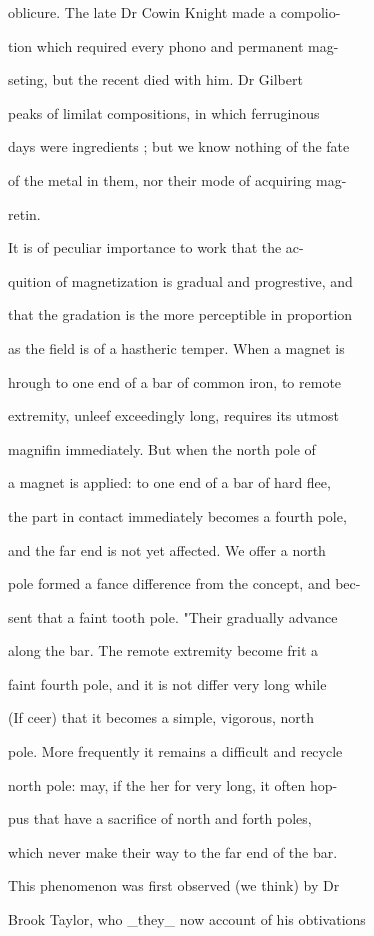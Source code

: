 \documentclass{article}
\begin{document}
oblicure. The late Dr Cowin Knight made a compolio-

tion which required every phono and permanent mag-

seting, but the recent died with him. Dr Gilbert

peaks of limilat compositions, in which ferruginous

days were ingredients ; but we know nothing of the fate

of the metal in them, nor their mode of acquiring mag-

retin.

It is of peculiar importance to work that the ac-

quition of magnetization is gradual and progrestive, and

that the gradation is the more perceptible in proportion

as the field is of a hastheric temper. When a magnet is

hrough to one end of a bar of common iron, to remote

extremity, unleef exceedingly long, requires its utmost

magnifin immediately. But when the north pole of

a magnet is applied: to one end of a bar of hard flee,

the part in contact immediately becomes a fourth pole,

and the far end is not yet affected. We offer a north

pole formed a fance difference from the concept, and bec-

sent that a faint tooth pole. "Their gradually advance

along the bar. The remote extremity become frit a

faint fourth pole, and it is not differ very long while

(If ceer) that it becomes a simple, vigorous, north

pole. More frequently it remains a difficult and recycle

north pole: may, if the her for very long, it often hop-

pus that have a sacrifice of north and forth poles,

which never make their way to the far end of the bar.

This phenomenon was first observed (we think) by Dr

Brook Taylor, who \_they\_ now account of his obtivations
\end{document}
